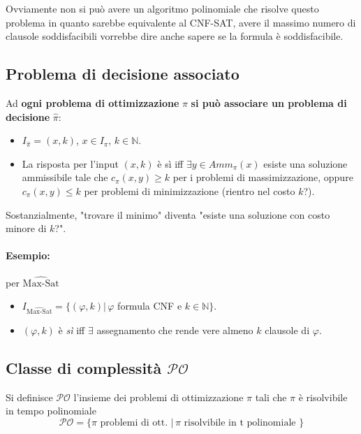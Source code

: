 \documentclass[11pt]{article}
\begin{document}
	Ovviamente non si può avere un algoritmo polinomiale che risolve questo problema in quanto sarebbe equivalente al CNF-SAT, avere il massimo numero di clausole soddisfacibili vorrebbe dire anche sapere se la formula è soddisfacibile.\\
	
	\newpage
	
	\subsection{Problema di decisione associato} 
	
	Ad \textbf{ogni problema di ottimizzazione} $\pi$ \textbf{si può associare un problema di decisione} $\hat{\pi}$:
	\begin{itemize}
		\item $I_{\hat{\pi}} = (x, k)$, $x \in I_\pi$, $k \in \mathbb{N}$.\\
		\item La risposta per l'input $(x,k)$ è sì iff $\exists y \in Amm_\pi (x)$ esiste una soluzione ammissibile tale che $c_\pi (x,y) \geq k$ per i problemi di massimizzazione, oppure $c_\pi (x,y) \leq k$ per problemi di minimizzazione (rientro nel costo $k$?).\\
	\end{itemize}
	
	Sostanzialmente, "trovare il minimo" diventa "esiste una soluzione con costo minore di $k$?".\\
	
	\paragraph{Esempio:} per $\hat{\text{Max-Sat}}$
	\begin{itemize}
		\item $I_{\hat{\text{Max-Sat}}} = \{ (\varphi, k) | \, \varphi$ formula CNF e $k \in \mathbb{N} \}$.\\
		\item $(\varphi, k)$ è \textit{sì} iff $\exists$ assegnamento che rende vere almeno $k$ clausole di $\varphi$.\\
	\end{itemize}
	
	\newpage
	
	\subsection{Classe di complessità $\mathcal{PO}$}
	Si definisce $\mathcal{PO}$ l'insieme dei problemi di ottimizzazione $\pi$ tali che $\pi$ è risolvibile in tempo polinomiale
	$$ \mathcal{PO} = \{\pi \text{ problemi di ott. } | \, \pi \text{ risolvibile in t polinomiale } \}$$
	
\end{document}
